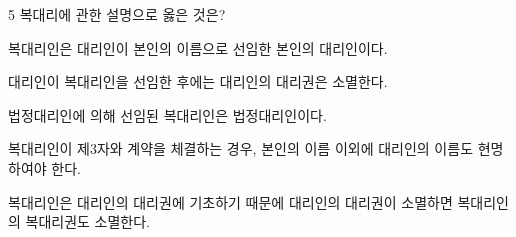 \begin{question}{5}
복대리에 관한 설명으로 옳은 것은?
\begin{choices}
  \item 복대리인은 대리인이 본인의 이름으로 선임한 본인의 대리인이다.
  \item 대리인이 복대리인을 선임한 후에는 대리인의 대리권은 소멸한다.
  \item 법정대리인에 의해 선임된 복대리인은 법정대리인이다.
  \item 복대리인이 제3자와 계약을 체결하는 경우, 본인의 이름 이외에 대리인의 이름도 현명하여야 한다.
  \item 복대리인은 대리인의 대리권에 기초하기 때문에 대리인의 대리권이 소멸하면 복대리인의 복대리권도 소멸한다.
\end{choices}
\end{question}
